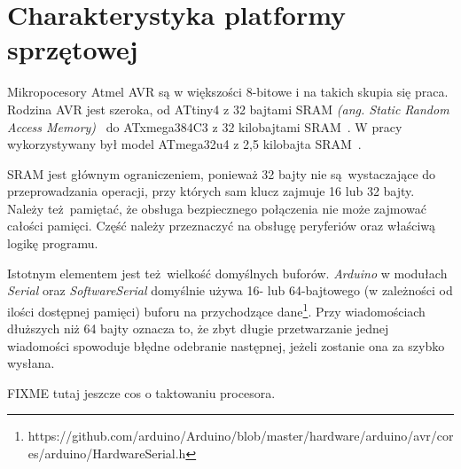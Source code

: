 \chapter{Charakterystyka platformy sprzętowej}
\label{cha:hardware}

Mikropocesory Atmel AVR są w większości 8-bitowe i na takich skupia się praca. Rodzina AVR jest szeroka, od ATtiny4 z 32 bajtami SRAM \emph{(ang. Static Random Access Memory)}~\cite{Attiny4} do ATxmega384C3 z 32 kilobajtami SRAM~\cite{Atxmega384}. W pracy wykorzystywany był model ATmega32u4 z 2,5 kilobajta SRAM~\cite{Atmega32}.

SRAM jest głównym ograniczeniem, ponieważ 32 bajty nie są wystaczające do przeprowadzania operacji, przy których sam klucz zajmuje 16 lub 32 bajty. Należy też pamiętać, że obsługa bezpiecznego połączenia nie może zajmować całości pamięci. Część należy przeznaczyć na obsługę peryferiów oraz właściwą logikę programu.

Istotnym elementem jest też wielkość domyślnych buforów. \emph{Arduino} w modułach \emph{Serial} oraz \emph{SoftwareSerial} domyślnie używa 16- lub 64-bajtowego (w zależności od ilości dostępnej pamięci) buforu na przychodzące dane\footnote{https://github.com/arduino/Arduino/blob/master/hardware/arduino/avr/cores/arduino/HardwareSerial.h}. Przy wiadomościach dłuższych niż 64 bajty oznacza to, że zbyt długie przetwarzanie jednej wiadomości spowoduje błędne odebranie następnej, jeżeli zostanie ona za szybko wysłana.

FIXME tutaj jeszcze cos o taktowaniu procesora.
